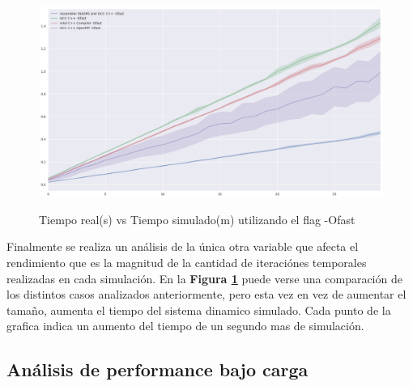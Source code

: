 \begin{figure}[!htbp]
\caption{Tiempo real(s) vs Tiempo simulado(m) utilizando el flag -Ofast}
\includegraphics[width=\textwidth]{imagenes/plot_time_omp_unused.png}
\label{fig:plot_time_omp_unused}
\end{figure}

Finalmente se realiza un análisis de la única otra variable que afecta el rendimiento que es la magnitud de la cantidad de iteraciónes temporales realizadas en cada simulación. En la \textbf{Figura \ref{fig:plot_time_omp_unused}} puede verse una comparación de los distintos casos analizados anteriormente, pero esta vez en vez de aumentar el tamaño, aumenta el tiempo del sistema dinamico simulado. Cada punto de la grafica indica un aumento del tiempo de un segundo mas de simulación. 


\subsection{Análisis de performance bajo carga}


